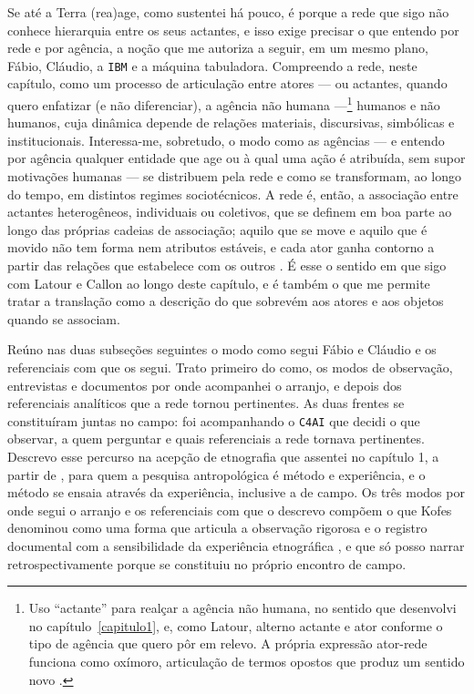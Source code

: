 Se até a Terra (rea)age, como sustentei há pouco, é porque a rede que sigo não conhece hierarquia entre os seus actantes, e isso exige precisar o que entendo por rede e por agência, a noção que me autoriza a seguir, em um mesmo plano, Fábio, Cláudio, a \texttt{IBM} e a máquina tabuladora. Compreendo a rede, neste capítulo, como um processo de articulação entre atores --- ou actantes, quando quero enfatizar (e não diferenciar), a agência não humana ---\footnote{Uso \enquote{actante} para realçar a agência não humana, no sentido que desenvolvi no capítulo~\ref{capitulo1}, e, como Latour, alterno actante e ator conforme o tipo de agência que quero pôr em relevo. A própria expressão ator-rede funciona como oxímoro, articulação de termos opostos que produz um sentido novo \parencite{latour1996clarifications}.} humanos e não humanos, cuja dinâmica depende de relações materiais, discursivas, simbólicas e institucionais. Interessa-me, sobretudo, o modo como as agências --- e entendo por agência qualquer entidade que age ou à qual uma ação é atribuída, sem supor motivações humanas --- se distribuem pela rede e como se transformam, ao longo do tempo, em distintos regimes sociotécnicos. A rede é, então, a associação entre actantes heterogêneos, individuais ou coletivos, que se definem em boa parte ao longo das próprias cadeias de associação; aquilo que se move e aquilo que é movido não tem forma nem atributos estáveis, e cada ator ganha contorno a partir das relações que estabelece com os outros \parencite{latour1996clarifications}. É esse o sentido em que sigo com Latour e Callon ao longo deste capítulo, e é também o que me permite tratar a translação como a descrição do que sobrevém aos atores e aos objetos quando se associam.

Reúno nas duas subseções seguintes o modo como segui Fábio e Cláudio e os referenciais com que os segui. Trato primeiro do como, os modos de observação, entrevistas e documentos por onde acompanhei o arranjo, e depois dos referenciais analíticos que a rede tornou pertinentes. As duas frentes se constituíram juntas no campo: foi acompanhando o \texttt{C4AI} que decidi o que observar, a quem perguntar e quais referenciais a rede tornava pertinentes. Descrevo esse percurso na acepção de etnografia que assentei no capítulo 1, a partir de \textcite{Kofes2015Maconaria}, para quem a pesquisa antropológica é método e experiência, e o método se ensaia através da experiência, inclusive a de campo. Os três modos por onde segui o arranjo e os referenciais com que o descrevo compõem o que Kofes denominou como uma forma que articula a observação rigorosa e o registro documental com a sensibilidade da experiência etnográfica \parencite[p.~299]{Kofes2015Maconaria}, e que só posso narrar retrospectivamente porque se constituiu no próprio encontro de campo.

